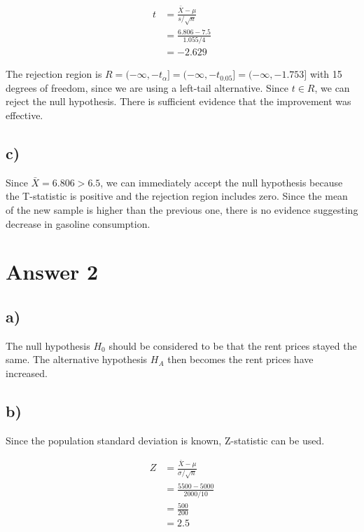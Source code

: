 \documentclass[12pt]{article}
\begin{document}
\begin{align*}
    \textit{t} &= \frac{\bar{X} - \mu}{s / \sqrt{n}} \\[0.75ex]
    &= \frac{6.806 - 7.5}{1.055 / 4} \\[0.75ex]
    &= -2.629
\end{align*}

The rejection region is $R = (-\infty, -\textit{t}_{\alpha}] = (-\infty,
-\textit{t}_{0.05}] = (-\infty, -1.753]$ with 15 degrees of freedom, since we
are using a left-tail alternative. Since $t \in R$, we can reject the null
hypothesis. There is sufficient evidence that the improvement was effective.

\subsection*{c)}

Since $\bar{X} = 6.806 > 6.5$, we can immediately accept the null hypothesis
because the T-statistic is positive and the rejection region includes zero.
Since the mean of the new sample is higher than the previous one, there is no
evidence suggesting decrease in gasoline consumption.

\section*{Answer 2}
\subsection*{a)}

The null hypothesis $H_0$ should be considered to be that the rent prices stayed
the same. The alternative hypothesis $H_A$ then becomes the rent prices have
increased.

\subsection*{b)}

Since the population standard deviation is known, Z-statistic can be used.

\begin{align*}
    Z &= \frac{\bar{X}-\mu}{\sigma / \sqrt{n}} \\[0.75ex]
    &= \frac{5500 - 5000}{2000 / 10} \\[0.75ex]
    &= \frac{500}{200} \\[0.75ex]
    &= 2.5
\end{align*}
\end{document}
